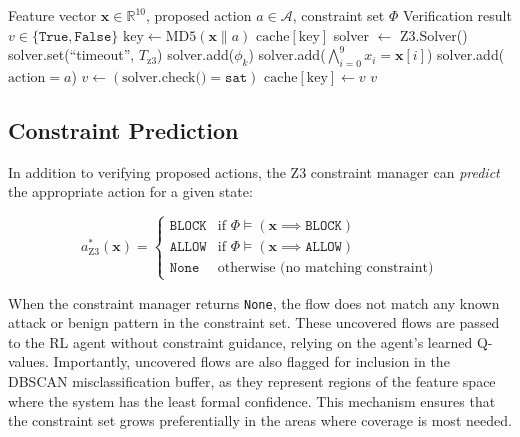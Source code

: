 \documentclass[12pt, letterpaper, oneside]{report}
\newcommand{\R}{\mathbb{R}}
\newcommand{\bx}{\mathbf{x}}
\begin{document}
\begin{algorithm}[htbp]
\caption{Z3 Action Verification}
\label{alg:z3_verify}
\begin{algorithmic}[1]
\Require Feature vector $\bx \in \R^{10}$, proposed action $a \in \mathcal{A}$, constraint set $\Phi$
\Ensure Verification result $v \in \{\texttt{True}, \texttt{False}\}$
\State $\text{key} \leftarrow \text{MD5}(\bx \| a)$
    \Return $\text{cache}[\text{key}]$
\EndIf
\State solver $\leftarrow$ Z3.Solver()
\State solver.set(``timeout'', $T_{\text{z3}}$) 
    \State solver.add($\phi_k$)
\EndFor
\State solver.add($\bigwedge_{i=0}^{9} x_i = \bx[i]$) 
\State solver.add($\text{action} = a$)
\State $v \leftarrow (\text{solver.check()} = \texttt{sat})$
\State $\text{cache}[\text{key}] \leftarrow v$
\State \Return $v$
\end{algorithmic}
\end{algorithm}

\subsection{Constraint Prediction}

In addition to verifying proposed actions, the Z3 constraint manager can \emph{predict} the appropriate action for a given state:

\begin{equation}
\label{eq:z3_predict}
a^*_{\text{Z3}}(\bx) = \begin{cases}
\texttt{BLOCK} & \text{if } \Phi \models (\bx \implies \texttt{BLOCK}) \\
\texttt{ALLOW} & \text{if } \Phi \models (\bx \implies \texttt{ALLOW}) \\
\texttt{None} & \text{otherwise (no matching constraint)}
\end{cases}
\end{equation}

\noindent When the constraint manager returns \texttt{None}, the flow does not match any known attack or benign pattern in the constraint set. These uncovered flows are passed to the RL agent without constraint guidance, relying on the agent's learned Q-values. Importantly, uncovered flows are also flagged for inclusion in the DBSCAN misclassification buffer, as they represent regions of the feature space where the system has the least formal confidence. This mechanism ensures that the constraint set grows preferentially in the areas where coverage is most needed.
\end{document}
